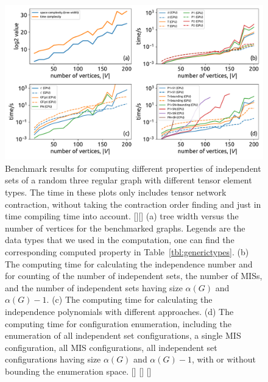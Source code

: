 \documentclass[onefignum, onetabnum]{siamart190516}
\newcommand{\<}{\langle}
\renewcommand{\>}{\rangle}
\newcommand{\Tbl}[1]{Table~\ref{#1}}
\newcommand{\red}[1]{[{\bf  \color{red}{ST: #1}}]}
\newcommand{\blue}[1]{[{\bf  \color{blue}{JG: #1}}]}
\begin{document}
\begin{figure} 
    \centering
    \includegraphics[width=\textwidth, trim={0cm 0cm 0cm 0cm}, clip]{figures/fig1.pdf}
    \caption{Benchmark results for computing different properties of independent sets of a random three regular graph with different tensor element types.
    The time in these plots only includes tensor network contraction, without taking the contraction order finding and just in time compiling time into account.
    \red{for each graph size, is there only one graph?}\blue{yes}
    (a) tree width versus the number of vertices for the benchmarked graphs. 
    Legends are the data types that we used in the computation, one can find the corresponding computed property in \Tbl{tbl:generictypes}.
    (b) The computing time for calculating the independence number and for counting of the number of independent sets, the number of MISs, and the number of independent sets having size $\alpha(G)$ and $\alpha(G)-1$.
    (c) The computing time for calculating the independence polynomials with different approaches.
    (d) The computing time for configuration enumeration, including the enumeration of all independent set configurations, a single MIS configuration, all MIS configurations, all independent set configurations having size $\alpha(G)$ and $\alpha(G)-1$,  with or without bounding the enumeration space.
    \red{suggestions for the figure: 1. the legend seems to overlap the lines, especially the large subfigure. Not sure what's a better way to include the legend there. 2. I see you guys don't typically use markers. We typically use markers to distinguish the different lines, as well as using the color. Especially, for some journals, there is a physical non-color copy, so some requires the figures to be understandable without colors.}
    \blue{If we use markers, the data poitns are too dense. I prefer not adding markers, not much people read papers with kindle or on paper.}
    \blue{I used a smaller fontsize, there are still some overlaps. Does it look better (or worse) now?}
    }
    \label{fig:benchmark}
\end{figure}
\end{document}
